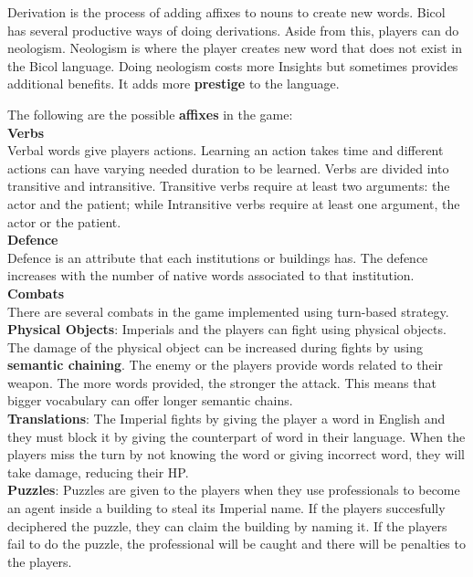 \documentclass[11pt]{article}
\begin{document}
Derivation is the process of adding affixes to nouns to create new words. Bicol has several productive ways of doing derivations. Aside from this, players can do neologism. Neologism is where the player creates new word that does not exist in the Bicol language. Doing neologism costs more Insights but sometimes provides additional benefits. It adds more \textbf{prestige} to the language.

The following are the possible \textbf{affixes} in the game:\\


\textbf{Verbs}\\
Verbal words give players actions. Learning an action takes time and different actions can have varying needed duration to be learned. Verbs are divided into transitive and intransitive. Transitive verbs require at least two arguments: the actor and the patient; while Intransitive verbs require at least one argument, the actor or the patient.\\

\textbf{Defence}\\
Defence is an attribute that each institutions or buildings has. The defence increases with the number of native words associated to that institution.\\

\textbf{Combats}\\
There are several combats in the game implemented using turn-based strategy.\\
\textbf{Physical Objects}:
Imperials and the players can fight using physical objects. The damage of the physical object can be increased during fights by using \textbf{semantic chaining}. The enemy or the players provide words related to their weapon. The more words provided, the stronger the attack. This means that bigger vocabulary can offer longer semantic chains.\\
\textbf{Translations}:
The Imperial fights by giving the player a word in English and they must block it by giving the counterpart of word in their language. When the players miss the turn by not knowing the word or giving incorrect word, they will take damage, reducing their HP.\\
\textbf{Puzzles}:
Puzzles are given to the players when they use professionals to become an agent inside a building to steal its Imperial name. If the players succesfully deciphered the puzzle, they can claim the building by naming it. If the players fail to do the puzzle, the professional will be caught and there will be penalties to the players. \\
\end{document}
